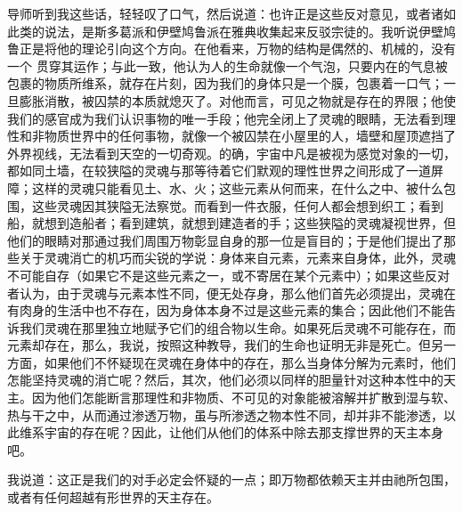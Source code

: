 导师听到我这些话，轻轻叹了口气，然后说道：也许正是这些反对意见，或者诸如此类的说法，是斯多葛派和伊壁鸠鲁派在雅典收集起来反驳宗徒的。我听说伊壁鸠鲁正是将他的理论引向这个方向。在他看来，万物的结构是偶然的、机械的，没有一个  贯穿其运作；与此一致，他认为人的生命就像一个气泡，只要内在的气息被包裹的物质所维系，就存在片刻，因为我们的身体只是一个膜，包裹着一口气；一旦膨胀消散，被囚禁的本质就熄灭了。对他而言，可见之物就是存在的界限；他使我们的感官成为我们认识事物的唯一手段；他完全闭上了灵魂的眼睛，无法看到理性和非物质世界中的任何事物，就像一个被囚禁在小屋里的人，墙壁和屋顶遮挡了外界视线，无法看到天空的一切奇观。的确，宇宙中凡是被视为感觉对象的一切，都如同土墙，在较狭隘的灵魂与那等待着它们默观的理性世界之间形成了一道屏障；这样的灵魂只能看见土、水、火；这些元素从何而来，在什么之中、被什么包围，这些灵魂因其狭隘无法察觉。而看到一件衣服，任何人都会想到织工；看到船，就想到造船者；看到建筑，就想到建造者的手；这些狭隘的灵魂凝视世界，但他们的眼睛对那通过我们周围万物彰显自身的那一位是盲目的；于是他们提出了那些关于灵魂消亡的机巧而尖锐的学说：身体来自元素，元素来自身体，此外，灵魂不可能自存（如果它不是这些元素之一，或不寄居在某个元素中）；如果这些反对者认为，由于灵魂与元素本性不同，便无处存身，那么他们首先必须提出，灵魂在有肉身的生活中也不存在，因为身体本身不过是这些元素的集合；因此他们不能告诉我们灵魂在那里独立地赋予它们的组合物以生命。如果死后灵魂不可能存在，而元素却存在，那么，我说，按照这种教导，我们的生命也证明无非是死亡。但另一方面，如果他们不怀疑现在灵魂在身体中的存在，那么当身体分解为元素时，他们怎能坚持灵魂的消亡呢？然后，其次，他们必须以同样的胆量针对这种本性中的天主。因为他们怎能断言那理性和非物质、不可见的对象能被溶解并扩散到湿与软、热与干之中，从而通过渗透万物，虽与所渗透之物本性不同，却并非不能渗透，以此维系宇宙的存在呢？因此，让他们从他们的体系中除去那支撑世界的天主本身吧。\par

我说道：这正是我们的对手必定会怀疑的一点；即万物都依赖天主并由祂所包围，或者有任何超越有形世界的天主存在。\par

